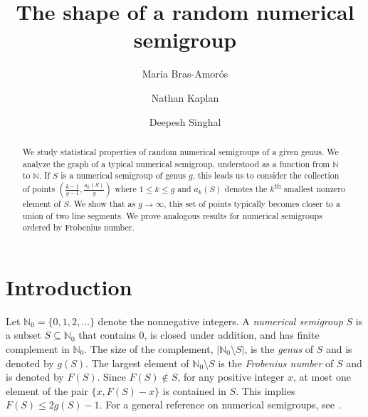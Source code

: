 \documentclass[12pt]{amsart}
\def\N{{\mathbb N}}
\begin{document}
\title{The shape of a random numerical semigroup}

\author{Maria Bras-Amor\'{o}s}
\address{Universitat Politècnica de Catalunya}

\author{Nathan Kaplan}
\address{Department of Mathematics, University of California, Irvine}

\author{Deepesh Singhal}
\address{Department of Mathematics, University of California, Irvine}



\begin{abstract}
We study statistical properties of random numerical semigroups of a given genus.  We analyze the graph of a typical numerical semigroup, understood as a function from $\N$ to $\N$.  If $S$ is a numerical semigroup of genus $g$, this leads us to consider the collection of points $\left(\frac{k-1}{g-1},\frac{a_k(S)}{g} \right)$ where $1 \le k \le g$ and $a_k(S)$ denotes the $k$\textsuperscript{th} smallest nonzero element of $S$.  We show that as $g \rightarrow \infty$, this set of points typically becomes closer to a union of two line segments.
We prove analogous results for numerical semigroups ordered by Frobenius number.
\end{abstract}
\maketitle


\section{Introduction}

Let $\N_0 = \{0,1,2,\ldots\}$ denote the nonnegative integers. A \emph{numerical semigroup} $S$ is a subset $S \subseteq \N_0$ that contains $0$, is closed under addition, and has finite complement in $\N_0$.  The size of the complement, $|\N_0 \setminus S|$, is the \emph{genus} of $S$ and is denoted by $g(S)$.  The largest element of $\N_0 \setminus S$ is the \emph{Frobenius number} of $S$ and is denoted by $F(S)$.  Since $F(S) \not\in S$, for any positive integer $x$, at most one element of the pair $\{x,F(S)-x\}$ is contained in $S$.  This implies $F(S) \le 2g(S)-1$.  For a general reference on numerical semigroups, see \cite{sanchez2009numerical}.
\end{document}

